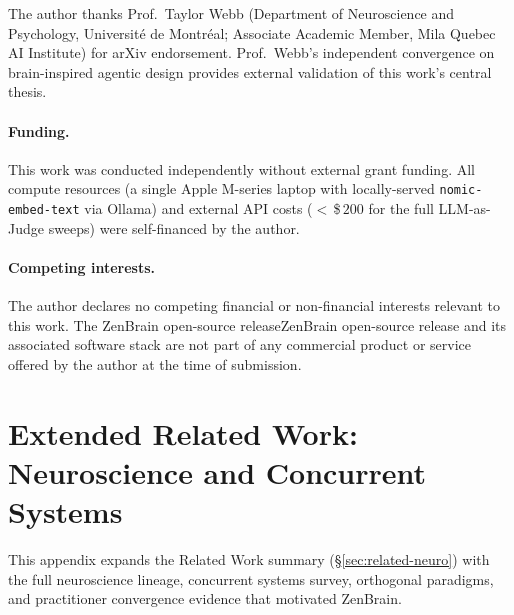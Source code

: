 \documentclass{article}
\makeatletter
\newcommand{\anon}[2]{\if@anonymous #2\else #1\fi}
\makeatother
\begin{document}
\begin{ack}
\label{sec:acks}

The author thanks Prof.\ Taylor Webb (Department of Neuroscience and
Psychology, Universit\'{e} de Montr\'{e}al; Associate Academic Member,
Mila Quebec AI Institute) for arXiv endorsement.  Prof.\ Webb's
independent convergence on brain-inspired agentic design
\citep{webb2025brain} provides external validation of this work's
central thesis.

\paragraph{Funding.} This work was conducted independently without
external grant funding. All compute resources (a single Apple
M-series laptop with locally-served \texttt{nomic-embed-text} via
Ollama) and external API costs ($<$\,\$\,$200$ for the full
LLM-as-Judge sweeps) were self-financed by the author.

\paragraph{Competing interests.} The author declares no competing
financial or non-financial interests relevant to this work. The
\anon{ZenBrain open-source release}{ZenBrain open-source release} and
its associated software stack are not part of any commercial
product or service offered by the author at the time of submission.
\end{ack}




\appendix

\section{Extended Related Work: Neuroscience and Concurrent Systems}
\label{app:extended-related}

This appendix expands the Related Work summary
(\S\ref{sec:related-neuro}) with the full neuroscience
lineage, concurrent systems survey, orthogonal paradigms, and
practitioner convergence evidence that motivated ZenBrain.
\end{document}
